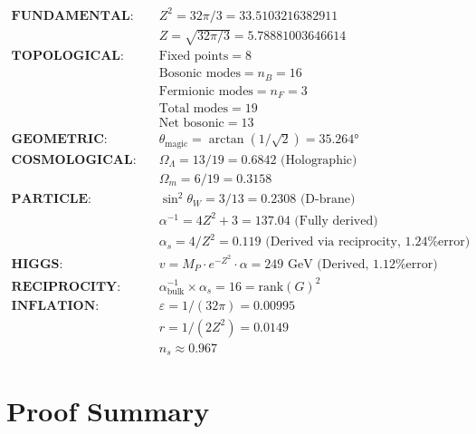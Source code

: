 \documentclass[12pt,a4paper]{article}
\newcommand{\OmegaL}{\Omega_\Lambda}
\newcommand{\OmegaM}{\Omega_m}
\newcommand{\sinW}{\sin^2\theta_W}
\newcommand{\nB}{n_B}
\newcommand{\nF}{n_F}
\newcommand{\Zsq}{Z^2}
\begin{document}
\begin{align}
\textbf{FUNDAMENTAL:} \quad & \Zsq = 32\pi/3 = 33.5103216382911 \\
& Z = \sqrt{32\pi/3} = 5.78881003646614 \\[1em]
\textbf{TOPOLOGICAL:} \quad & \text{Fixed points} = 8 \\
& \text{Bosonic modes} = \nB = 16 \\
& \text{Fermionic modes} = \nF = 3 \\
& \text{Total modes} = 19 \\
& \text{Net bosonic} = 13 \\[1em]
\textbf{GEOMETRIC:} \quad & \theta_{\text{magic}} = \arctan(1/\sqrt{2}) = 35.264° \\[1em]
\textbf{COSMOLOGICAL:} \quad & \OmegaL = 13/19 = 0.6842 \text{ (Holographic)} \\
& \OmegaM = 6/19 = 0.3158 \\[1em]
\textbf{PARTICLE:} \quad & \sinW = 3/13 = 0.2308 \text{ (D-brane)} \\
& \alpha^{-1} = 4\Zsq + 3 = 137.04 \text{ (Fully derived)} \\
& \alpha_s = 4/\Zsq = 0.119 \text{ (Derived via reciprocity, 1.24\% error)} \\[1em]
\textbf{HIGGS:} \quad & v = M_P \cdot e^{-\Zsq} \cdot \alpha = 249 \text{ GeV (Derived, 1.12\% error)} \\[1em]
\textbf{RECIPROCITY:} \quad & \alpha^{-1}_{\text{bulk}} \times \alpha_s = 16 = \text{rank}(G)^2 \\[1em]
\textbf{INFLATION:} \quad & \varepsilon = 1/(32\pi) = 0.00995 \\
& r = 1/(2\Zsq) = 0.0149 \\
& n_s \approx 0.967
\end{align}

\section{Proof Summary}
\end{document}
